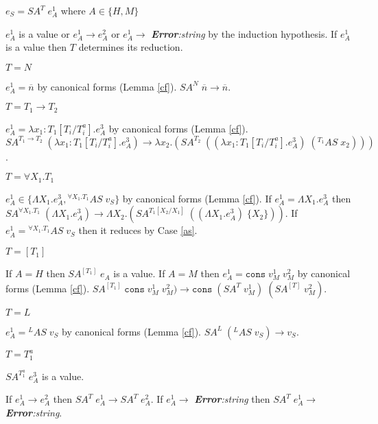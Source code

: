 \begin{case}
$e_{S}=SA^{T}\;e_{A}^{1}$ where $A\in\lbrace H,M\rbrace$

$e_{A}^{1}$ is a value or $e_{A}^{1}\rightarrow e_{A}^{2}$ or $e_{A}^{1}\rightarrow$ \emph{\textbf{Error}:\;string} by the induction hypothesis.  If $e_{A}^{1}$ is a value then $T$ determines its reduction.
\begin{subcase}
$T=N$

$e_{A}^{1}=\overline{n}$ by canonical forms (Lemma \ref{cf}).  $SA^{N}\;\overline{n}\rightarrow\overline{n}$.
\end{subcase}
\begin{subcase}
$T=T_{1}\rightarrow T_{2}$

$e_{A}^{1}=\lambda x_{1}:T_{1}[T_{i}/T_{i}^{a}].e_{A}^{3}$ by canonical forms (Lemma \ref{cf}).  $SA^{T_{1}\rightarrow T_{2}}\;(\lambda x_{1}:T_{1}[T_{i}/T_{i}^{a}].e_{A}^{3})\rightarrow\lambda x_{2}.(SA^{T_{2}}\;((\lambda x_{1}:T_{1}[T_{i}/T_{i}^{a}].e_{A}^{3})\;(^{T_{1}}AS\;x_{2})))$.
\end{subcase}
\begin{subcase}
$T=\forall X_{1}.T_{1}$

$e_{A}^{1}\in\lbrace\Lambda X_{1}.e_{A}^{3},{^{\forall X_{1}.T_{1}}A}S\;v_{S}\rbrace$ by canonical forms (Lemma \ref{cf}).  If $e_{A}^{1}=\Lambda X_{1}.e_{A}^{3}$ then $SA^{\forall X_{1}.T_{1}}\;(\Lambda X_{1}.e_{A}^{3})\rightarrow\Lambda X_{2}.(SA^{T_{1}[X_{2}/X_{1}]}\;((\Lambda X_{1}.e_{A}^{3})\;\lbrace X_{2}\rbrace))$.  If $e_{A}^{1}={^{\forall X_{1}.T_{1}}A}S\;v_{S}$ then it reduces by Case \ref{as}.
\end{subcase}
\begin{subcase}
$T=[T_{1}]$

If $A=H$ then $SA^{[T_{1}]}\;e_{A}$ is a value.  If $A=M$ then $e_{A}^{1}=\mathtt{cons}\;v_{M}^{1}\;v_{M}^{2}$ by canonical forms (Lemma \ref{cf}).  $SA^{[T_{1}]}\;\mathtt{cons}\;v_{M}^{1}\;v_{M}^{2})\rightarrow\mathtt{cons}\;(SA^{T}\;v_{M}^{1})\;(SA^{[T]}\;v_{M}^{2})$.
\end{subcase}
\begin{subcase}
$T=L$

$e_{A}^{1}={^{L}A}S\;v_{S}$ by canonical forms (Lemma \ref{cf}).  $SA^{L}\;(^{L}AS\;v_{S})\rightarrow v_{S}$.
\end{subcase}
\begin{subcase}
$T=T_{1}^{a}$

$SA^{T_{1}^{a}}\;e_{A}^{3}$ is a value.
\end{subcase}
If $e_{A}^{1}\rightarrow e_{A}^{2}$ then $SA^{T}\;e_{A}^{1}\rightarrow SA^{T}\;e_{A}^{2}$.  If $e_{A}^{1}\rightarrow$ \emph{\textbf{Error}:\;string} then $SA^{T}\;e_{A}^{1}\rightarrow$ \emph{\textbf{Error}:\;string}.
\end{case}